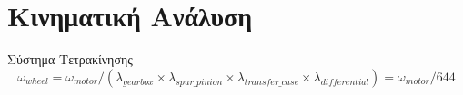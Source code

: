 \documentclass[10pt, compress, handout]{beamer} %
\begin{document}
\section{Κινηματική Ανάλυση}

\begin{frame}{Σύστημα Τετρακίνησης}
	\begin{equation*}
	\omega_{wheel} = \omega_{motor} / (\lambda_{gearbox} \times \lambda_{spur\_pinion} \times \lambda_{transfer\_case} \times \lambda_{differential}) = \omega_{motor} / 644
	\end{equation*}\\[-0.3cm]
	\begin{figure}
		\centering
		\\[0.15cm]
		\hspace{0.5cm}
		\hspace{0.5cm}
	\end{figure}
\end{frame}
\end{document}
